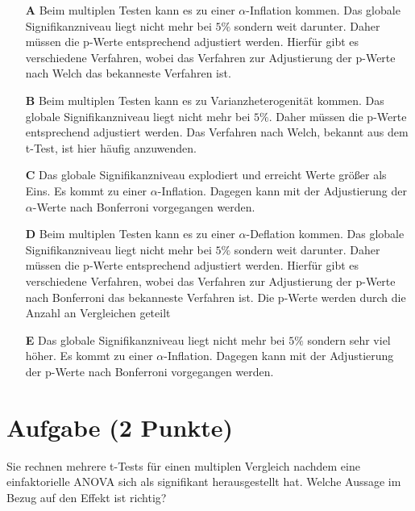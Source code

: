 \documentclass[a4paper, 9pt]{scrartcl}\usepackage[]{graphicx}\usepackage[]{xcolor}
\begin{document}
\begin{enumerate}
\item [\textbf{A} \msquare] Beim multiplen Testen kann es zu einer $\alpha$-Inflation kommen. Das globale Signifikanzniveau liegt nicht mehr bei $5\%$ sondern weit darunter. Daher müssen die p-Werte entsprechend adjustiert werden. Hierfür gibt es verschiedene Verfahren, wobei das Verfahren zur Adjustierung der p-Werte nach Welch das bekanneste Verfahren ist.
\item [\textbf{B} \msquare] Beim multiplen Testen kann es zu Varianzheterogenität kommen. Das globale Signifikanzniveau liegt nicht mehr bei $5\%$. Daher müssen die p-Werte entsprechend adjustiert werden. Das Verfahren nach Welch, bekannt aus dem t-Test, ist hier häufig anzuwenden.
\item [\textbf{C} \msquare] Das globale Signifikanzniveau explodiert und erreicht Werte größer als Eins. Es kommt zu einer $\alpha$-Inflation. Dagegen kann mit der Adjustierung der $\alpha$-Werte nach Bonferroni vorgegangen werden.
\item [\textbf{D} \msquare] Beim multiplen Testen kann es zu einer $\alpha$-Deflation kommen. Das globale Signifikanzniveau liegt nicht mehr bei $5\%$ sondern weit darunter. Daher müssen die p-Werte entsprechend adjustiert werden. Hierfür gibt es verschiedene Verfahren, wobei das Verfahren zur Adjustierung der p-Werte nach Bonferroni das bekanneste Verfahren ist. Die p-Werte werden durch die Anzahl an Vergleichen geteilt
\item [\textbf{E} \msquare] Das globale Signifikanzniveau liegt nicht mehr bei $5\%$ sondern sehr viel höher. Es kommt zu einer $\alpha$-Inflation. Dagegen kann mit der Adjustierung der p-Werte nach Bonferroni vorgegangen werden.
\end{enumerate}

\section{Aufgabe \hfill (2 Punkte)}




Sie rechnen mehrere t-Tests für einen multiplen Vergleich nachdem eine einfaktorielle ANOVA sich als signifikant herausgestellt hat. Welche Aussage im Bezug auf den Effekt ist richtig? 
\end{document}
